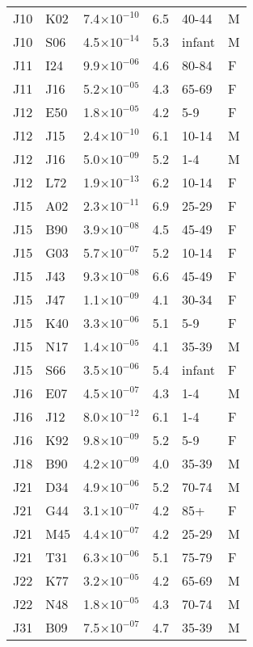 \begin{longtable}{lllrll}
   J10 & K02 & 7.4$\times10^{-10}$ & 6.5 & 40-44 & M \\ 
   J10 & S06 & 4.5$\times10^{-14}$ & 5.3 & infant & M \\ 
   J11 & I24 & 9.9$\times10^{-06}$ & 4.6 & 80-84 & F \\ 
   J11 & J16 & 5.2$\times10^{-05}$ & 4.3 & 65-69 & F \\ 
   J12 & E50 & 1.8$\times10^{-05}$ & 4.2 & 5-9 & F \\ 
   J12 & J15 & 2.4$\times10^{-10}$ & 6.1 & 10-14 & M \\ 
   J12 & J16 & 5.0$\times10^{-09}$ & 5.2 & 1-4 & M \\ 
   J12 & L72 & 1.9$\times10^{-13}$ & 6.2 & 10-14 & F \\ 
   J15 & A02 & 2.3$\times10^{-11}$ & 6.9 & 25-29 & F \\ 
   J15 & B90 & 3.9$\times10^{-08}$ & 4.5 & 45-49 & F \\ 
   J15 & G03 & 5.7$\times10^{-07}$ & 5.2 & 10-14 & F \\ 
   J15 & J43 & 9.3$\times10^{-08}$ & 6.6 & 45-49 & F \\ 
   J15 & J47 & 1.1$\times10^{-09}$ & 4.1 & 30-34 & F \\ 
   J15 & K40 & 3.3$\times10^{-06}$ & 5.1 & 5-9 & F \\ 
   J15 & N17 & 1.4$\times10^{-05}$ & 4.1 & 35-39 & M \\ 
   J15 & S66 & 3.5$\times10^{-06}$ & 5.4 & infant & F \\ 
   J16 & E07 & 4.5$\times10^{-07}$ & 4.3 & 1-4 & M \\ 
   J16 & J12 & 8.0$\times10^{-12}$ & 6.1 & 1-4 & F \\ 
   J16 & K92 & 9.8$\times10^{-09}$ & 5.2 & 5-9 & F \\ 
   J18 & B90 & 4.2$\times10^{-09}$ & 4.0 & 35-39 & M \\ 
   J21 & D34 & 4.9$\times10^{-06}$ & 5.2 & 70-74 & M \\ 
   J21 & G44 & 3.1$\times10^{-07}$ & 4.2 & 85+ & F \\ 
   J21 & M45 & 4.4$\times10^{-07}$ & 4.2 & 25-29 & M \\ 
   J21 & T31 & 6.3$\times10^{-06}$ & 5.1 & 75-79 & F \\ 
   J22 & K77 & 3.2$\times10^{-05}$ & 4.2 & 65-69 & M \\ 
   J22 & N48 & 1.8$\times10^{-05}$ & 4.3 & 70-74 & M \\ 
   J31 & B09 & 7.5$\times10^{-07}$ & 4.7 & 35-39 & M \\ 

\end{longtable}

